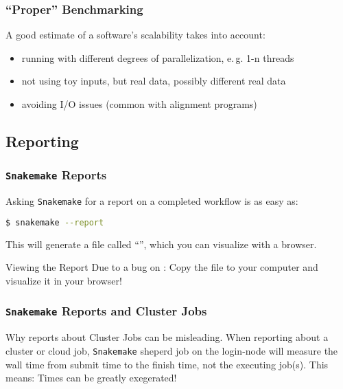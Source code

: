 \begin{frame}
  \frametitle{``Proper'' Benchmarking}
  A good estimate of a software's scalability takes into account:
  \begin{itemize}[<+->]
   \item running with different degrees of parallelization, e.\,g. 1-n threads
   \item not using toy inputs, but real data, possibly different real data
   \item avoiding I/O issues (common with alignment programs)
  \end{itemize}
\end{frame}


\subsection{Reporting}


\begin{frame}[fragile]
  \frametitle{\texttt{Snakemake} Reports}
  Asking \texttt{Snakemake} for a report on a completed workflow is as easy as:
  \begin{lstlisting}[language=Bash, style=Shell]
$ snakemake --report
  \end{lstlisting}
  This will generate a file called ``'', which you can visualize with a browser.
  \pause
  \begin{alertblock}{Viewing the Report}
   Due to a bug on \mogon: Copy the file to your computer and visualize it in your browser!
  \end{alertblock}
\end{frame} 

\begin{frame}
  \frametitle{\texttt{Snakemake} Reports and Cluster Jobs}
  \begin{alertblock}{Why reports about Cluster Jobs can be misleading.}
    When reporting about a cluster or cloud job, \texttt{Snakemake} sheperd job on the login-node will measure the wall time from submit time to the finish time, not the executing job(s).\newline
    This means: Times can be greatly exegerated!
  \end{alertblock}

\end{frame} 

